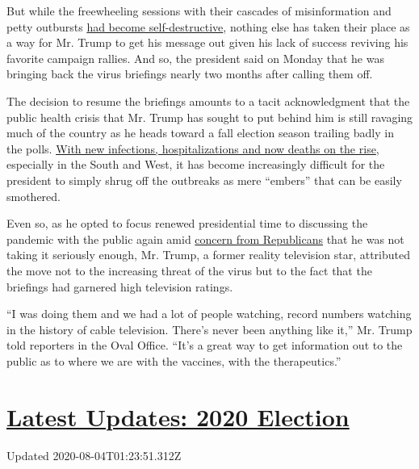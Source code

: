 But while the freewheeling sessions with their cascades of
misinformation and petty outbursts
\href{https://www.nytimes3xbfgragh.onion/2020/04/09/us/politics/trump-coronavirus-press-briefing.html}{had
become self-destructive}, nothing else has taken their place as a way
for Mr. Trump to get his message out given his lack of success reviving
his favorite campaign rallies. And so, the president said on Monday that
he was bringing back the virus briefings nearly two months after calling
them off.

The decision to resume the briefings amounts to a tacit acknowledgment
that the public health crisis that Mr. Trump has sought to put behind
him is still ravaging much of the country as he heads toward a fall
election season trailing badly in the polls.
\href{https://www.nytimes3xbfgragh.onion/interactive/2020/us/coronavirus-us-cases.html}{With
new infections, hospitalizations and now deaths on the rise}, especially
in the South and West, it has become increasingly difficult for the
president to simply shrug off the outbreaks as mere ``embers'' that can
be easily smothered.

Even so, as he opted to focus renewed presidential time to discussing
the pandemic with the public again amid
\href{https://www.nytimes3xbfgragh.onion/2020/07/19/us/politics/republicans-contradict-trump-coronavirus.html}{concern
from Republicans} that he was not taking it seriously enough, Mr. Trump,
a former reality television star, attributed the move not to the
increasing threat of the virus but to the fact that the briefings had
garnered high television ratings.

``I was doing them and we had a lot of people watching, record numbers
watching in the history of cable television. There's never been anything
like it,'' Mr. Trump told reporters in the Oval Office. ``It's a great
way to get information out to the public as to where we are with the
vaccines, with the therapeutics.''

\hypertarget{latest-updates-2020-election}{%
\section{\texorpdfstring{\href{https://www.nytimes3xbfgragh.onion/2020/08/03/us/elections/biden-vs-trump.html?action=click\&pgtype=Article\&state=default\&region=MAIN_CONTENT_1\&context=storylines_live_updates}{Latest
Updates: 2020
Election}}{Latest Updates: 2020 Election}}\label{latest-updates-2020-election}}

Updated 2020-08-04T01:23:51.312Z

